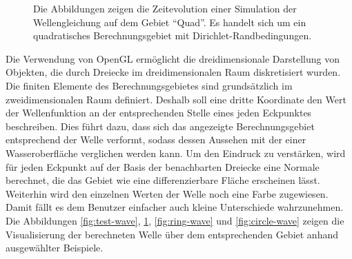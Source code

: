 \documentclass[crop=false,10pt,ngerman]{standalone}
\begin{document}
\begin{figure}[p]
\begin{subfigure}[b]{0.24\textwidth}
          \caption{}
        \end{subfigure}
        \caption[Wellensimulation auf einem quadratischen Gebiet]{%
          Die Abbildungen zeigen die Zeitevolution einer Simulation der Wellengleichung auf dem Gebiet \enquote{Quad}.
          Es handelt sich um ein quadratisches Berechnungsgebiet mit Dirichlet-Randbedingungen.
        }
        \label{fig:quad-wave}
      \end{figure}

      Die Verwendung von OpenGL ermöglicht die dreidimensionale Darstellung von Objekten, die durch Dreiecke im dreidimensionalen Raum diskretisiert wurden.
      Die finiten Elemente des Berechnungsgebietes sind grundsätzlich im zweidimensionalen Raum definiert.
      Deshalb soll eine dritte Koordinate den Wert der Wellenfunktion an der entsprechenden Stelle eines jeden Eckpunktes beschreiben.
      Dies führt dazu, dass sich das angezeigte Berechnungsgebiet entsprechend der Welle verformt, sodass dessen Aussehen mit der einer Wasseroberfläche verglichen werden kann.
      Um den Eindruck zu verstärken, wird für jeden Eckpunkt auf der Basis der benachbarten Dreiecke eine Normale berechnet, die das Gebiet wie eine differenzierbare Fläche erscheinen lässt.
      Weiterhin wird den einzelnen Werten der Welle noch eine Farbe zugewiesen.
      Damit fällt es dem Benutzer einfacher auch kleine Unterschiede wahrzunehmen.
      Die Abbildungen \ref{fig:test-wave}, \ref{fig:quad-wave}, \ref{fig:ring-wave} und \ref{fig:circle-wave} zeigen die Visualisierung der berechneten Welle über dem entsprechenden Gebiet anhand ausgewählter Beispiele.

\end{document}
